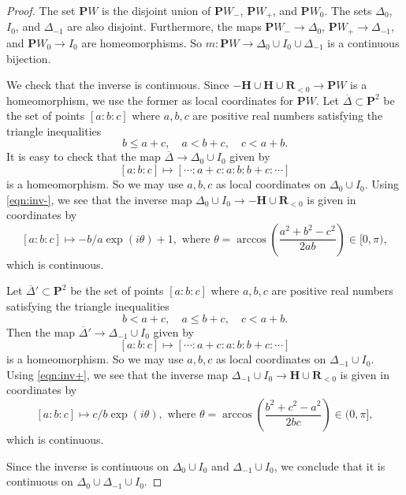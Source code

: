 \documentclass{amsart}
\begin{document}
\begin{proof}
  The set \(\mathbf{P}W\) is the disjoint union of \(\mathbf{P}W_-\), \(\mathbf{P}W_{+}\), and \(\mathbf{P}W_0\).
  The sets \(\Delta_0\), \(I_{0}\), and \(\Delta_{-1}\) are also disjoint.
  Furthermore, the maps \(\mathbf{P}W_- \to \Delta_0\), \(\mathbf{P}W_+ \to \Delta_{-1}\), and \(\mathbf{P}W_0 \to I_0\) are homeomorphisms.
  So \(m \colon \mathbf{P} W \to \Delta_0 \cup I_0 \cup \Delta_{-1}\) is a continuous bijection.

  We check that the inverse is continuous.
  Since \(-\mathbf{H} \cup \mathbf{H} \cup \mathbf{R}_{<0} \to \mathbf{P}W\) is a homeomorphism, we use the former as local coordinates for \(\mathbf{P} W\).
  Let \(\overline \Delta \subset \mathbf{P}^2\) be the set of points \([a:b:c]\) where \(a,b,c\) are positive real numbers satisfying the triangle inequalities
  \[ b \leq a+c, \quad a < b+c, \quad c < a+b.\]
  It is easy to check that the map \(\overline \Delta \to \Delta_0 \cup I_0\) given by
 \[ [a:b:c] \mapsto [\cdots :a+c:a:b:b+c: \cdots]\]
 is a homeomorphism.
 So we may use \(a,b,c\) as local coordinates on \(\Delta_0 \cup I_0\).
  Using \eqref{eqn:inv-}, we see that the inverse map \(\Delta_0 \cup I_0 \to -\mathbf{H} \cup \mathbf{R}_{<0}\) is given in coordinates by
  \[ [a:b:c] \mapsto  - b/a \exp(i \theta) + 1, \text{ where } \theta = \arccos \left( \frac{a^2+b^2-c^2}{2ab} \right) \in [0,\pi),\]
  which is continuous.

  Let \(\overline \Delta' \subset \mathbf{P}^2\) be the set of points \([a:b:c]\) where \(a,b,c\) are positive real numbers satisfying the triangle inequalities
  \[ b < a+c, \quad a \leq b+c, \quad c < a+b.\]
  Then the map \(\overline \Delta' \to \Delta_{-1} \cup I_0\) given by
  \[ [a:b:c] \mapsto [\cdots :a+c:a:b:b+c: \cdots]\]
  is a homeomorphism.
  So we may use \(a,b,c\) as local coordinates on \(\Delta_{-1} \cup I_0\).
  Using \eqref{eqn:inv+}, we see that the inverse map \(\Delta_{-1} \cup I_0 \to \mathbf{H} \cup \mathbf{R}_{<0}\) is given in coordinates by
  \[
    [a:b:c] \mapsto c/b \exp(i \theta), \text{ where } \theta = \arccos \left( \frac{b^2+c^2-a^2}{2bc} \right) \in (0,\pi],
  \]
  which is continuous.

  Since the inverse is continuous on \(\Delta_0 \cup I_0\) and \(\Delta_{-1} \cup I_0\), we conclude that it is continuous on \(\Delta_0 \cup \Delta_{-1} \cup I_0\).
\end{proof}
\end{document}
